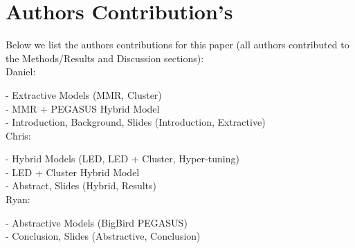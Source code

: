 \documentclass[11pt]{article}
\begin{document}
\section{Authors Contribution's}

Below we list the authors contributions for this paper (all authors contributed to the Methods/Results and Discussion sections):\\

\noindent Daniel: 

- Extractive Models (MMR, Cluster)\\
\indent- MMR + PEGASUS Hybrid Model\\
\indent- Introduction, Background, Slides (Introduction, Extractive) \\

\noindent Chris: 

- Hybrid Models (LED, LED + Cluster, Hyper-tuning)\\
\indent- LED + Cluster Hybrid Model\\
\indent- Abstract, Slides (Hybrid, Results)\\

\noindent Ryan: 

- Abstractive Models (BigBird PEGASUS)\\
\indent- Conclusion, Slides (Abstractive, Conclusion)\\

\nocite{Eidelman_2019, agarwal-etal-2022-extractive, 9397119, Jain2024-ht, pmlr-v119-zhang20ae, zaheer2021bigbirdtransformerslonger, reimers-2019-sentence-bert}






\appendix
\end{document}
